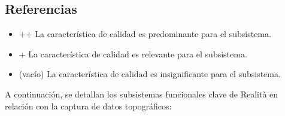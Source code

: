 \documentclass[12pt,a4paper, twoside]{article} %
\begin{document}
\subsection*{Referencias}

\begin{itemize}
    \item ++ La característica de calidad es predominante para el subsistema.
    \item + La característica de calidad es relevante para el subsistema.
    \item (vacío) La característica de calidad es insignificante para el subsistema.
\end{itemize}


A continuación, se detallan los subsistemas funcionales clave de Realità en relación con la captura de datos topográficos:
\end{document}
